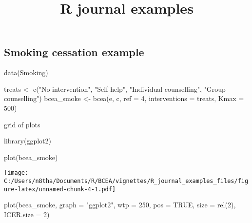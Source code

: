\documentclass[
]{article}
\title{R journal examples}
\author{}
\date{\vspace{-2.5em}}
\newenvironment{Shaded}{\begin{snugshade}}{\end{snugshade}}
\newcommand{\AttributeTok}[1]{\textcolor[rgb]{0.77,0.63,0.00}{#1}}
\newcommand{\ConstantTok}[1]{\textcolor[rgb]{0.00,0.00,0.00}{#1}}
\newcommand{\DecValTok}[1]{\textcolor[rgb]{0.00,0.00,0.81}{#1}}
\newcommand{\FunctionTok}[1]{\textcolor[rgb]{0.00,0.00,0.00}{#1}}
\newcommand{\NormalTok}[1]{#1}
\newcommand{\OtherTok}[1]{\textcolor[rgb]{0.56,0.35,0.01}{#1}}
\newcommand{\StringTok}[1]{\textcolor[rgb]{0.31,0.60,0.02}{#1}}
\begin{document}
\maketitle

\hypertarget{smoking-cessation-example}{%
\subsection{Smoking cessation example}\label{smoking-cessation-example}}

\begin{Shaded}
\begin{Highlighting}[]
\FunctionTok{data}\NormalTok{(Smoking)}

\NormalTok{treats }\OtherTok{\textless{}{-}} \FunctionTok{c}\NormalTok{(}\StringTok{"No intervention"}\NormalTok{, }\StringTok{"Self{-}help"}\NormalTok{, }\StringTok{"Individual counselling"}\NormalTok{, }\StringTok{"Group counselling"}\NormalTok{)}
\NormalTok{bcea\_smoke }\OtherTok{\textless{}{-}} \FunctionTok{bcea}\NormalTok{(e, c, }\AttributeTok{ref =} \DecValTok{4}\NormalTok{, }\AttributeTok{interventions =}\NormalTok{ treats, }\AttributeTok{Kmax =} \DecValTok{500}\NormalTok{)}
\end{Highlighting}
\end{Shaded}

grid of plots

\begin{Shaded}
\begin{Highlighting}[]
\FunctionTok{library}\NormalTok{(ggplot2)}

\FunctionTok{plot}\NormalTok{(bcea\_smoke)}
\end{Highlighting}
\end{Shaded}

\texttt{[image: C:/Users/n8tha/Documents/R/BCEA/vignettes/R\_journal\_examples\_files/figure-latex/unnamed-chunk-4-1.pdf]}

\begin{Shaded}
\begin{Highlighting}[]

\FunctionTok{plot}\NormalTok{(bcea\_smoke, }\AttributeTok{graph =} \StringTok{"ggplot2"}\NormalTok{, }\AttributeTok{wtp =} \DecValTok{250}\NormalTok{, }\AttributeTok{pos =} \ConstantTok{TRUE}\NormalTok{, }\AttributeTok{size =} \FunctionTok{rel}\NormalTok{(}\DecValTok{2}\NormalTok{), }\AttributeTok{ICER.size =} \DecValTok{2}\NormalTok{)}
\end{Highlighting}
\end{Shaded}
\end{document}

